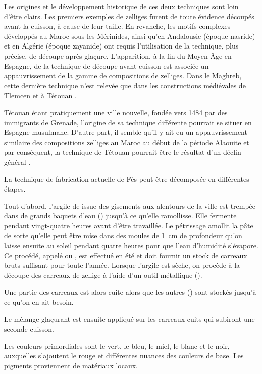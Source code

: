 Les origines et le développement historique de ces deux techniques 
sont loin d'être clairs. Les premiers exemples de zelliges 
 furent 
de toute évidence découpés avant la cuisson, à cause de leur taille. 
En revanche, les motifs complexes développés au Maroc sous les 
Mérinides, ainsi qu'en Andalousie (époque nasride) et en Algérie 
(époque zayanide) ont requis l'utilisation de la technique, plus 
précise, de découpe après glaçure. L'apparition, à la fin du Moyen-Âge 
en Espagne, de la technique de découpe avant cuisson est associée un 
appauvrissement de la gamme de compositions de zelliges. Dans le 
Maghreb, cette dernière technique n'est relevée que dans les 
constructions médiévales de Tlemcen et à Tétouan 
\autocite{Erzini_1993a}.

Tétouan étant pratiquement une ville nouvelle, fondée vers 1484 
par des immigrants de Grenade, l'origine de sa technique différente 
pourrait se situer en Espagne musulmane. D'autre part, il semble 
qu'il y ait eu un appauvrissement similaire des compositions zelliges 
au Maroc au début de la période Alaouite et par conséquent, la 
technique de Tétouan pourrait être le résultat d'un déclin général 
\autocite{Erzini_1993b}.

La technique de fabrication actuelle de Fès peut être décomposée en 
différentes étapes.

Tout d'abord, l'argile de  issue des gisements aux 
alentours de la ville est trempée dans de grands baquets d'eau 
(\zwabi) jusqu'à ce qu'elle ramollisse. 
Elle fermente pendant vingt-quatre heures avant d'être travaillée. 
Le pétrissage amollit la pâte de sorte qu'elle peut être mise dans 
des moules de \SI{1}{\cm} de profondeur qu'on laisse ensuite au soleil 
pendant quatre heures pour que l'eau d'humidité s'évapore. 
Ce procédé, appelé \tansif ou \tagfif, est 
effectué en été et doit fournir un stock de carreaux bruts suffisant 
pour toute l'année. 
Lorsque l'argile est sèche, on procède à la découpe des carreaux de 
zellige à l'aide d'un outil métallique (\alqala).

Une partie des carreaux est alors cuite alors que les autres 
(\mzihrinayy) sont stockés jusqu'à ce qu'on en ait besoin.

Le mélange glaçurant est ensuite appliqué sur les carreaux cuits qui 
subiront une seconde cuisson.

Les couleurs primordiales sont le vert, le bleu, le miel, le blanc 
et le noir, auxquelles s'ajoutent le rouge et différentes nuances 
des couleurs de base. Les pigments proviennent de matériaux locaux.

